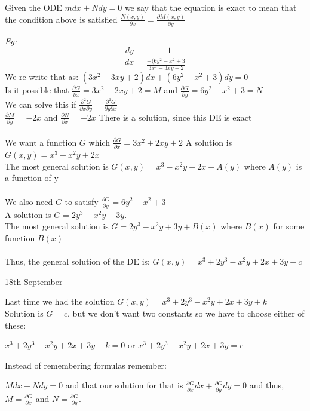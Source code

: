 \documentclass[11pt]{article}
\theoremstyle{definition}
\begin{document}
Given the ODE $mdx + Ndy = 0$ we say that the equation is exact to mean that the condition above is satisfied $\frac{N(x,y)}{\partial x} = \frac{\partial M(x,y)}{\partial y}$

\textit{Eg:} 
$$
\frac{dy}{dx} = \frac{-1}{\frac{-(6y^2-x^2+3}{3x^2-3xy+2}}
$$
We re-write that as: $(3x^2-3xy+2)dx + (6y^2-x^2+3)dy = 0$\\
Is it possible that $\frac{\partial G}{\partial x} = 3x^2-2xy + 2 = M$ and $\frac{\partial G}{\partial y} = 6y^2 -x^2 + 3 = N$\\
We can solve this if $\frac{\partial^2G}{\partial x \partial y} = \frac{\partial^2G}{\partial y \partial x}$\\
$\frac{\partial M}{\partial y} = -2x$ and $\frac{\partial N}{\partial x} = -2x$
There is a solution, since this DE is exact\\\\
We want a function $G$ which $\frac{\partial G}{\partial x} = 3x^2 + 2xy + 2$
A solution is $G(x,y) = x^3 -x^2y + 2x$\\The most general solution is $G(x,y) = x^3 -x^2y + 2x + A(y)$ where $A(y)$ is a function of y\\\\
We also need $G$ to satisfy $\frac{\partial G}{\partial y} = 6y^2 -x^2 + 3$\\
A solution is $G = 2y^3 -x^2y + 3y$.\\ The most general solution is $G = 2y^3 -x^2y + 3y + B(x)$ where $B(x)$ for some function $B(x)$\\\\
Thus, the general solution of the DE is: $G(x,y) = x^3 + 2y^3 - x^2y + 2x + 3y + c$

\begin{center}
    {\LARGE 18th September}\\
\end{center}
Last time we had the solution $G(x,y) = x^3 + 2y^3 - x^2y + 2x + 3y + k$\\
Solution is $G=c$, but we don't want two constants so we have to choose either of these:

$x^3 + 2y^3 - x^2y + 2x + 3y + k = 0$ or $x^3 + 2y^3 - x^2y + 2x + 3y = c$

Instead of remembering formulas remember:

$Mdx + Ndy = 0$ and that our solution for that is $\frac{\partial G}{\partial x}dx + \frac{\partial G}{\partial y}dy = 0$ and thus, $M=\frac{\partial G}{\partial x}$ and $N = \frac{\partial G}{\partial y}$.
\end{document}

